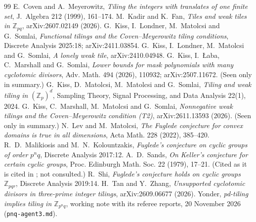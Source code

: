 \documentclass[11pt,a4paper]{amsart}
\theoremstyle{definition}
\theoremstyle{remark}
\newcommand{\Z}{\mathbb{Z}}
\newcommand{\lean}[1]{\texttt{#1}}
\begin{document}
\begin{thebibliography}{99}
 E.~Coven and A.~Meyerowitz, \emph{Tiling the integers with translates of one finite set},
 J.~Algebra 212 (1999), 161--174.
 M.~Kadir and K.~Fan, \emph{Tiles and weak tiles in $\Z_{pq}$}, arXiv:2607.02149 (2026).
 G.~Kiss, I.~Londner, M.~Matolcsi and G.~Somlai, \emph{Functional tilings and the
 Coven--Meyerowitz tiling conditions}, Discrete Analysis 2025:18; arXiv:2411.03854.
 G.~Kiss, I.~Londner, M.~Matolcsi and G.~Somlai, \emph{A lonely weak tile}, arXiv:2410.04948.
 G.~Kiss, I.~{\L}aba, C.~Marshall and G.~Somlai, \emph{Lower bounds for mask polynomials with many
cyclotomic divisors}, Adv. Math. 494 (2026), 110932; arXiv:2507.11672. (Seen only in summary.)
 G.~Kiss, D.~Matolcsi, M.~Matolcsi and G.~Somlai, \emph{Tiling and weak tiling in $(\Z_p)^d$},
 Sampling Theory, Signal Processing, and Data Analysis 22(1), 2024.
 G.~Kiss, C.~Marshall, M.~Matolcsi and G.~Somlai, \emph{Nonnegative weak tilings and the
Coven--Meyerowitz condition (T2)}, arXiv:2611.13593 (2026). (Seen only in summary.)
 N.~Lev and M.~Matolcsi, \emph{The Fuglede conjecture for convex domains is true in all
 dimensions}, Acta Math. 228 (2022), 385--420.
 R.~D.~Malikiosis and M.~N.~Kolountzakis, \emph{Fuglede's conjecture on cyclic groups of order
 $p^nq$}, Discrete Analysis 2017:12.
 A.~D.~Sands, \emph{On Keller's conjecture for certain cyclic groups}, Proc. Edinburgh Math. Soc. 22
(1979), 17--21. (Cited as it is cited in \cite{CM}; not consulted.)
 R.~Shi, \emph{Fuglede's conjecture holds on cyclic groups $\Z_{pqr}$}, Discrete Analysis 2019:14.
 H.~Tan and Y.~Zhang, \emph{Unsupported cyclotomic divisors in three-prime integer tilings},
 arXiv:2609.06677 (2026).
 Yonder, \emph{pd-tiling implies tiling in $\Z_{p^nq}$}, working note with its referee
 reports, 20 November 2026 (\lean{pnq-agent3.md}).
\end{thebibliography}
\end{document}
